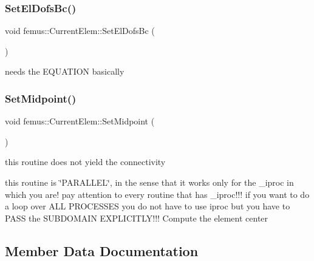 \mbox{\label{classfemus_1_1_current_elem_a2fc8e65fa40bdcda9cfcb7c5447439ad}} 
\subsubsection{\texorpdfstring{Set\+El\+Dofs\+Bc()}{SetElDofsBc()}}
{\footnotesize\ttfamily void femus\+::\+Current\+Elem\+::\+Set\+El\+Dofs\+Bc (\begin{DoxyParamCaption}{ }\end{DoxyParamCaption})}

needs the E\+Q\+U\+A\+T\+I\+ON basically \mbox{\label{classfemus_1_1_current_elem_a5fe589a6224b2b1f618d67fb0bce7e38}} 
\subsubsection{\texorpdfstring{Set\+Midpoint()}{SetMidpoint()}}
{\footnotesize\ttfamily void femus\+::\+Current\+Elem\+::\+Set\+Midpoint (\begin{DoxyParamCaption}{ }\end{DoxyParamCaption})}



this routine does not yield the connectivity 

this routine is \char`\"{}\+P\+A\+R\+A\+L\+L\+E\+L\char`\"{}, in the sense that it works only for the \+\_\+iproc in which you are! pay attention to every routine that has \+\_\+iproc!!! if you want to do a loop over A\+LL P\+R\+O\+C\+E\+S\+S\+ES you do not have to use iproc but you have to P\+A\+SS the S\+U\+B\+D\+O\+M\+A\+IN E\+X\+P\+L\+I\+C\+I\+T\+L\+Y!!! Compute the element center 

\subsection{Member Data Documentation}
\mbox{\label{classfemus_1_1_current_elem_af1164c456d9c52edc77d1c0c005bbe9c}} 

